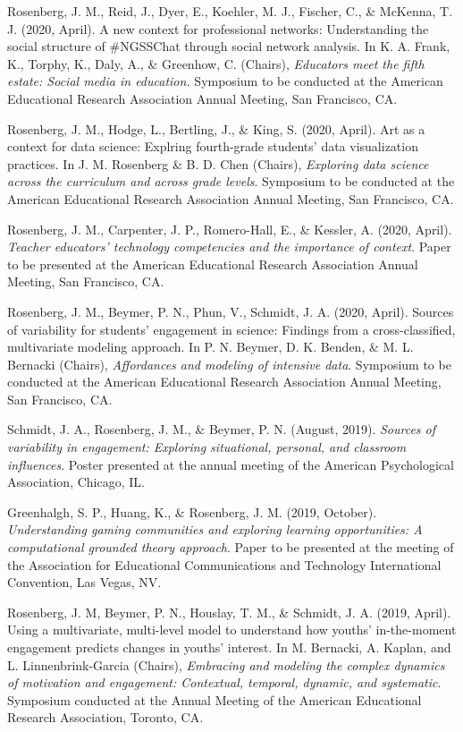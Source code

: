 \documentclass[14,]{article}
\begin{document}
Rosenberg, J. M., Reid, J., Dyer, E., Koehler, M. J., Fischer, C., \&
McKenna, T. J. (2020, April). A new context for professional networks:
Understanding the social structure of \#NGSSChat through social network
analysis. In K. A. Frank, K., Torphy, K., Daly, A., \& Greenhow, C.
(Chairs), \emph{Educators meet the fifth estate: Social media in
education.} Symposium to be conducted at the American Educational
Research Association Annual Meeting, San Francisco, CA.

Rosenberg, J. M., Hodge, L., Bertling, J., \& King, S. (2020, April).
Art as a context for data science: Explring fourth-grade students' data
visualization practices. In J. M. Rosenberg \& B. D. Chen (Chairs),
\emph{Exploring data science across the curriculum and across grade
levels}. Symposium to be conducted at the American Educational Research
Association Annual Meeting, San Francisco, CA.

Rosenberg, J. M., Carpenter, J. P., Romero-Hall, E., \& Kessler, A.
(2020, April). \emph{Teacher educators' technology competencies and the
importance of context}. Paper to be presented at the American
Educational Research Association Annual Meeting, San Francisco, CA.

Rosenberg, J. M., Beymer, P. N., Phun, V., Schmidt, J. A. (2020, April).
Sources of variability for students' engagement in science: Findings
from a cross-classified, multivariate modeling approach. In P. N.
Beymer, D. K. Benden, \& M. L. Bernacki (Chairs), \emph{Affordances and
modeling of intensive data}. Symposium to be conducted at the American
Educational Research Association Annual Meeting, San Francisco, CA.

Schmidt, J. A., Rosenberg, J. M., \& Beymer, P. N. (August, 2019).
\emph{Sources of variability in engagement: Exploring situational,
personal, and classroom influences}. Poster presented at the annual
meeting of the American Psychological Association, Chicago, IL.

Greenhalgh, S. P., Huang, K., \& Rosenberg, J. M. (2019, October).
\emph{Understanding gaming communities and exploring learning
opportunities: A computational grounded theory approach}. Paper to be
presented at the meeting of the Association for Educational
Communications and Technology International Convention, Las Vegas, NV.

Rosenberg, J. M, Beymer, P. N., Houslay, T. M., \& Schmidt, J. A. (2019,
April). Using a multivariate, multi-level model to understand how
youths' in-the-moment engagement predicts changes in youths' interest.
In M. Bernacki, A. Kaplan, and L. Linnenbrink-Garcia (Chairs),
\emph{Embracing and modeling the complex dynamics of motivation and
engagement: Contextual, temporal, dynamic, and systematic}. Symposium
conducted at the Annual Meeting of the American Educational Research
Association, Toronto, CA.
\end{document}
